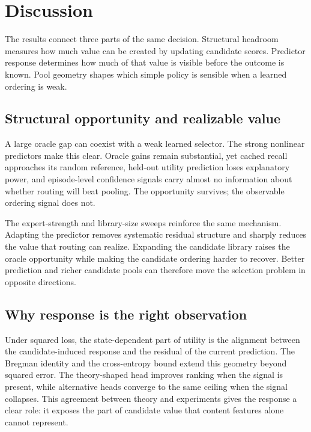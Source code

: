 \section{Discussion}
\label{sec:discussion}

The results connect three parts of the same decision. Structural headroom
measures how much value can be created by updating candidate scores. Predictor
response determines how much of that value is visible before the outcome is
known. Pool geometry shapes which simple policy is sensible when a learned
ordering is weak.

\subsection{Structural opportunity and realizable value}

A large oracle gap can coexist with a weak learned selector. The strong
nonlinear predictors make this clear. Oracle gains remain substantial, yet
cached recall approaches its random reference, held-out utility prediction
loses explanatory power, and episode-level confidence signals carry almost no
information about whether routing will beat pooling. The opportunity survives;
the observable ordering signal does not.

The expert-strength and library-size sweeps reinforce the same mechanism.
Adapting the predictor removes systematic residual structure and sharply
reduces the value that routing can realize. Expanding the candidate library
raises the oracle opportunity while making the candidate ordering harder to
recover. Better prediction and richer candidate pools can therefore move the
selection problem in opposite directions.

\subsection{Why response is the right observation}

Under squared loss, the state-dependent part of utility is the alignment
between the candidate-induced response and the residual of the current
prediction. The Bregman identity and the cross-entropy bound extend this
geometry beyond squared error. The theory-shaped head improves ranking when the
signal is present, while alternative heads converge to the same ceiling when
the signal collapses. This agreement between theory and experiments gives the
response a clear role: it exposes the part of candidate value that content
features alone cannot represent.

